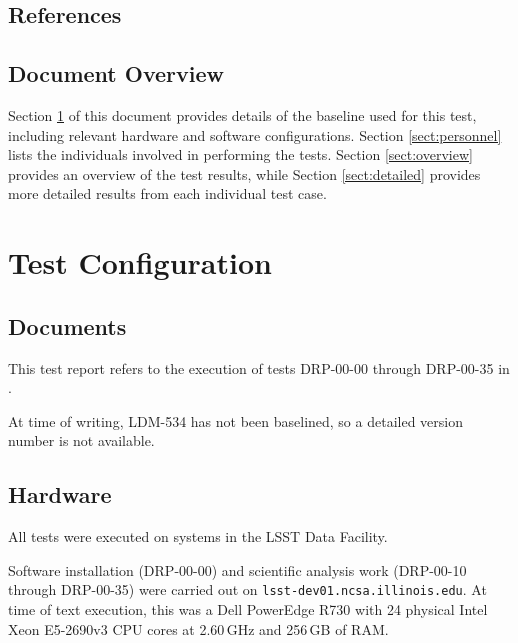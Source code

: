\documentclass[DM,lsstdraft,STR,toc]{lsstdoc}
\begin{document}
\subsection{References}
\label{sect:references}

\renewcommand{\refname}{}


\subsection{Document Overview}
\label{sect:docoverview}

Section \ref{sect:configuration} of this document provides details of the \product{} baseline used for this test, including relevant hardware and software configurations.
Section \ref{sect:personnel} lists the individuals involved in performing the tests.
Section \ref{sect:overview} provides an overview of the test results, while Section \ref{sect:detailed} provides more detailed results from each individual test case.

\section{Test Configuration}
\label{sect:configuration}

\subsection{Documents}

This test report refers to the execution of tests DRP-00-00 through DRP-00-35 in .

\begin{note}
At time of writing, LDM-534 has not been baselined, so a detailed version
number is not available.
\end{note}

\subsection{Hardware}
\label{sect:hwconf}

All tests were executed on systems in the LSST Data Facility.

Software installation (DRP-00-00) and scientific analysis work (DRP-00-10 through DRP-00-35) were carried out on \texttt{lsst-dev01.ncsa.illinois.edu}.
At time of text execution, this was a Dell PowerEdge R730 with 24 physical Intel Xeon E5-2690v3 CPU cores at 2.60\,GHz and 256\,GB of RAM.
\end{document}
